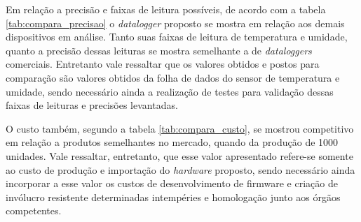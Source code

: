 Em relação a precisão e faixas de leitura possíveis, de acordo com a tabela \ref{tab:compara_precisao} o \textit{datalogger} proposto se mostra em relação aos demais dispositivos em análise. Tanto suas faixas de leitura de temperatura e umidade, quanto a precisão dessas leituras se mostra semelhante a de \textit{dataloggers} comerciais. Entretanto vale ressaltar que os valores obtidos e postos para comparação são valores obtidos da folha de dados do sensor de temperatura e umidade, sendo necessário ainda a realização de testes para validação dessas faixas de leituras e precisões levantadas. 
\begin{table}[!h]
	
	\captionsetup{width=7cm}%
    \end{table}

O custo também, segundo a tabela \ref{tab:compara_custo}, se mostrou competitivo em relação a produtos semelhantes no mercado, quando da produção de 1000 unidades. Vale ressaltar, entretanto, que esse valor apresentado refere-se somente ao custo de produção e importação do \textit{hardware} proposto, sendo necessário ainda incorporar a esse valor os custos de desenvolvimento de firmware e criação de invólucro resistente determinadas intempéries e homologação junto aos órgãos competentes. 


